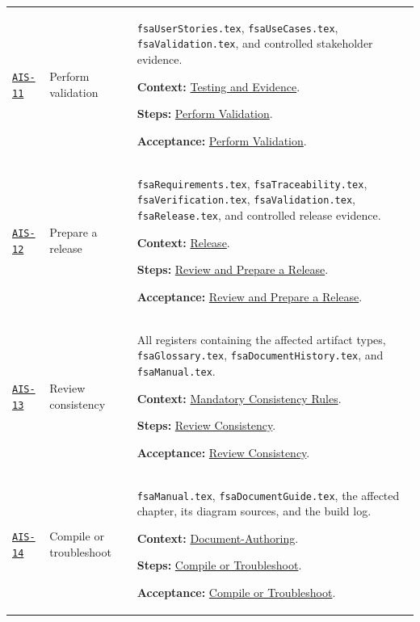 \begin{tabularx}{\linewidth}{L{1.6cm}L{3.1cm}Y}
\label{Skill:AIS-11}\hyperref[Section:AIValidationSteps]{\texttt{AIS-11}} & Perform validation & \texttt{fsaUserStories.tex}, \texttt{fsaUseCases.tex}, \texttt{fsaValidation.tex}, and controlled stakeholder evidence.\par\textbf{Context:} \hyperref[Section:AITestingContext]{Testing and Evidence}.\par\textbf{Steps:} \hyperref[Section:AIValidationTaskSteps]{Perform Validation}.\par\textbf{Acceptance:} \hyperref[Section:AIValidationAcceptance]{Perform Validation}.\\
\label{Skill:AIS-12}\hyperref[Section:AIReleaseSteps]{\texttt{AIS-12}} & Prepare a release & \texttt{fsaRequirements.tex}, \texttt{fsaTraceability.tex}, \texttt{fsaVerification.tex}, \texttt{fsaValidation.tex}, \texttt{fsaRelease.tex}, and controlled release evidence.\par\textbf{Context:} \hyperref[Section:AIReleaseContext]{Release}.\par\textbf{Steps:} \hyperref[Section:AIReleaseTaskSteps]{Review and Prepare a Release}.\par\textbf{Acceptance:} \hyperref[Section:AIReleaseAcceptance]{Review and Prepare a Release}.\\
\label{Skill:AIS-13}\hyperref[Section:AIConsistencySteps]{\texttt{AIS-13}} & Review consistency & All registers containing the affected artifact types, \texttt{fsaGlossary.tex}, \texttt{fsaDocumentHistory.tex}, and \texttt{fsaManual.tex}.\par\textbf{Context:} \hyperref[Section:AIConsistencyRules]{Mandatory Consistency Rules}.\par\textbf{Steps:} \hyperref[Section:AIConsistencyTaskSteps]{Review Consistency}.\par\textbf{Acceptance:} \hyperref[Section:AIConsistencyAcceptance]{Review Consistency}.\\
\label{Skill:AIS-14}\hyperref[Section:AIBuildSteps]{\texttt{AIS-14}} & Compile or troubleshoot & \texttt{fsaManual.tex}, \texttt{fsaDocumentGuide.tex}, the affected chapter, its diagram sources, and the build log.\par\textbf{Context:} \hyperref[Section:AIDocumentContext]{Document-Authoring}.\par\textbf{Steps:} \hyperref[Section:AIBuildTaskSteps]{Compile or Troubleshoot}.\par\textbf{Acceptance:} \hyperref[Section:AIBuildAcceptance]{Compile or Troubleshoot}.\\
\end{tabularx}
\normalsize

